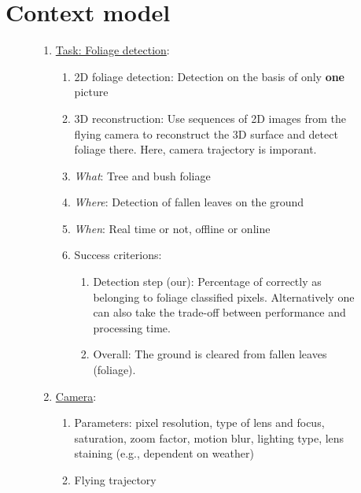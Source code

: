 \documentclass[fleqn,10pt]{SelfArx} %
\begin{document}
\section{Context model}

\begin{figure}[ht!]
\begin{enumerate}[nolistsep]
 \item \underline{Task: Foliage detection}:
    \begin{enumerate}[nolistsep]
	\item 2D foliage detection: Detection on the basis of only \textbf{one} picture
	\item 3D reconstruction: Use sequences of 2D images from the flying camera to reconstruct the 3D surface and detect foliage there. Here, camera trajectory is imporant.
	\item \emph{What}: Tree and bush foliage
	\item \emph{Where}: Detection of fallen leaves on the ground
	\item \emph{When}: Real time or not, offline or online
	\item Success criterions: 
	  \begin{enumerate}[nolistsep]
	    \item Detection step (our): Percentage of correctly as belonging to foliage classified pixels. Alternatively one can also take the trade-off between performance and processing time.
	    \item Overall: The ground is cleared from fallen leaves (foliage).
	  \end{enumerate}
    \end{enumerate}
 
 \item \underline{Camera}:
    \begin{enumerate}[nolistsep]
    \item Parameters: pixel resolution, type of lens and focus, saturation, zoom factor, motion blur, lighting type, lens staining (e.g., dependent on weather)
    \item Flying trajectory
    \end{enumerate}
      

\end{enumerate}
\end{figure}
\end{document}

